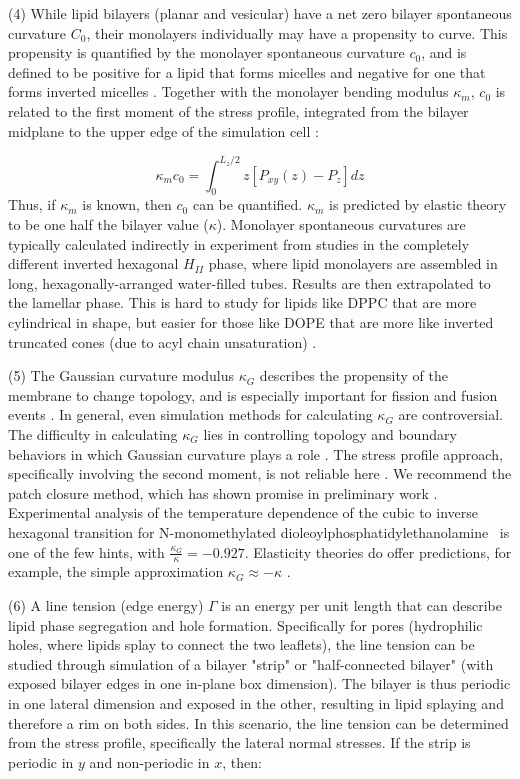 \documentclass[9pt,bestpractices]{livecoms}
\begin{document}
(4) While lipid bilayers (planar and vesicular) have a net zero bilayer spontaneous curvature $C_0$, their monolayers individually may have a propensity to curve.
This propensity is quantified by the monolayer spontaneous curvature $c_0$, and is defined to be positive for a lipid that forms micelles and negative for one that forms inverted micelles \cite{Venable2015}.
Together with the monolayer bending modulus $\kappa_m$, $c_0$ is related to the first moment of the stress profile, integrated from the bilayer midplane to the upper edge of the simulation cell \cite{Safran1994}:

\begin{equation}\label{eq:10}
	\kappa_m c_0 = \int_{0}^{L_z/2} z[P_{xy}(z) - P_z]dz
\end{equation}
Thus, if $\kappa_m$ is known, then $c_0$ can be quantified.
$\kappa_m$ is predicted by elastic theory to be one half the bilayer value ($\kappa$).
Monolayer spontaneous curvatures are typically calculated indirectly in experiment from studies in the completely different inverted hexagonal $H_{II}$ phase, where lipid monolayers are assembled in long, hexagonally-arranged water-filled tubes.
Results are then extrapolated to the lamellar phase.
This is hard to study for lipids like DPPC that are more cylindrical in shape, but easier for those like DOPE that are more like inverted truncated cones (due to acyl chain unsaturation) \cite{Venable2015,Israelachvili2011}.

(5) The Gaussian curvature modulus $\kappa_G$ describes the propensity of the membrane to change topology, and is especially important for fission and fusion events \cite{Hu2012a}.
In general, even simulation methods for calculating $\kappa_G$ are controversial.
The difficulty in calculating $\kappa_G$ lies in controlling topology and boundary behaviors in which Gaussian curvature plays a role \cite{Hu2012a}.
The stress profile approach, specifically involving the second moment, is not reliable here \cite{Hu2012a,Hu2013}.
We recommend the patch closure method, which has shown promise in preliminary work \cite{Hu2012a}.
Experimental analysis of the temperature dependence of the cubic to inverse hexagonal transition for N-monomethylated dioleoylphosphatidylethanolamine~\cite{Siegel2008} is one of the few hints, with $\frac{\kappa_G}{\kappa}=-0.927$.  
Elasticity theories do offer predictions, for example, the simple approximation $\kappa_G \approx -\kappa$ \cite{Deserno2009,Hu2012a,Ramakrishnan2014c}.

(6) A line tension (edge energy) $\Gamma$ is an energy per unit length that can describe lipid phase segregation and hole formation.
Specifically for pores (hydrophilic holes, where lipids splay to connect the two leaflets), the line tension can be studied through simulation of a bilayer "strip" or "half-connected bilayer" (with exposed bilayer edges in one in-plane box dimension).
The bilayer is thus periodic in one lateral dimension and exposed in the other, resulting in lipid splaying and therefore a rim on both sides.
In this scenario, the line tension can be determined from the stress profile, specifically the lateral normal stresses.
If the strip is periodic in $y$ and non-periodic in $x$, then:
\end{document}
